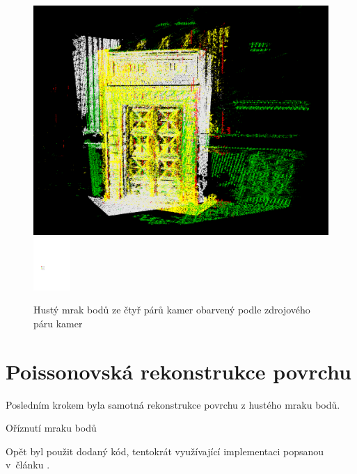 \documentclass[11pt,oneside,a4paper,pdftex]{article}   %
\begin{document}
			\begin{figure}[htbp]
					\centering
						\includegraphics[width=12.8cm]{pictures/points_from_stereo_coloured_by_pair-pairs-01_02-01_05-02_06-03_07.png}
						\hskip 10pt
						\includegraphics[height=2cm]{pictures/points_from_stereo_coloured-legend.pdf}
				\caption{Hustý mrak bodů ze čtyř párů kamer obarvený podle zdrojového páru kamer}
				\label{figPointsFromStereoColouredBySourcePair}
			\end{figure}
	
	
\section{Poissonovská rekonstrukce povrchu}

	Posledním krokem byla samotná rekonstrukce povrchu z hustého mraku bodů.

	Oříznutí mraku bodů
	
	Opět byl použit dodaný kód,
	tentokrát využívající implementaci popsanou v~článku \cite{Kazhdan:2006:PSR}.
	
\end{document}
